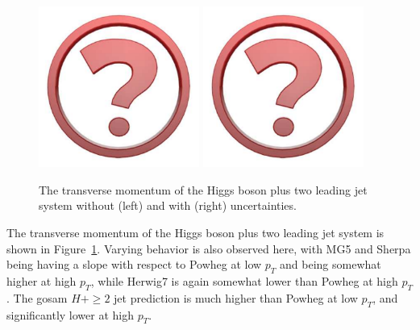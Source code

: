 \begin{figure}[t!]
  \centering
  \includegraphics[width=0.47\textwidth]{Micon.pdf}
  \hfill
  \includegraphics[width=0.47\textwidth]{Micon.pdf}
  \caption{
    The transverse momentum of the Higgs boson plus two leading jet
    system without (left) and with (right) uncertainties.
    \label{fig:higgscomp:results:2obs:hjj_pt}
  }
\end{figure}

The transverse momentum of the Higgs boson plus two leading jet system
is shown in Figure~\ref{fig:higgscomp:results:2obs:hjj_pt}. Varying
behavior is also observed here, with MG5 and Sherpa being having a
slope with respect to Powheg at low $p_T$ and being somewhat higher at
high $p_T$, while Herwig7 is again somewhat lower than Powheg at high
$p_T$. The gosam $H+\ge2$ jet prediction is much higher than Powheg at
low $p_T$, and significantly lower at high $p_T$.


